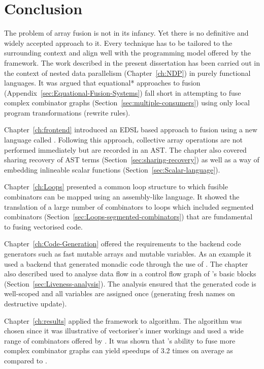 \documentclass[preamble.tex]{subfiles}
\begin{document}
\clearpage

\chapter{Conclusion}

The problem of array fusion is not in its infancy. Yet there is no definitive and widely accepted approach to it. Every technique has to be tailored to the surrounding context and align well with the programming model offered by the framework. The work described in the present dissertation has been carried out in the context of nested data parallelism (Chapter~\ref{ch:NDP}) in purely functional languages. It was argued that \*equational* approaches to fusion (Appendix~\ref{sec:Equational-Fusion-Systems}) fall short in attempting to fuse complex combinator graphs (Section~\ref{sec:multiple-consumers}) using only local program transformations (rewrite rules).

Chapter~\ref{ch:frontend} introduced an EDSL based approach to fusion using a new language called \LiveFusion. Following this approach, collective array operations are not performed immediately but are recorded in an AST. The chapter also covered sharing recovery of AST terms (Section~\ref{sec:sharing-recovery}) as well as a way of embedding inlineable scalar functions (Section~\ref{sec:Scalar-language}).

Chapter~\ref{ch:Loops} presented a common loop structure to which fusible combinators can be mapped using an assembly-like \Loop language. It showed the translation of a large number of combinators to loops which included segmented combinators (Section~\ref{sec:Loops-segmented-combinators}) that are fundamental to fusing vectorised code.

Chapter~\ref{ch:Code-Generation} offered the requirements to the backend code generators such as fast mutable arrays and mutable variables. As an example it used a backend that generated monadic \Haskell code through the use of . The chapter also described  used to analyse data flow in a control flow graph of \Loop's basic blocks (Section~\ref{sec:Liveness-analysis}). The analysis ensured that the generated code is well-scoped and all variables are assigned once (generating fresh names on destructive update).

Chapter~\ref{ch:results} applied the \LiveFusion framework to \QuickHull algorithm. The algorithm was chosen since it was illustrative of \DPH vectoriser's inner workings and used a wide range of combinators offered by \LiveFusion. It was shown that \LiveFusion's ability to fuse more complex combinator graphs can yield speedups of 3.2 times on average as compared to \StreamFusion.
\end{document}
